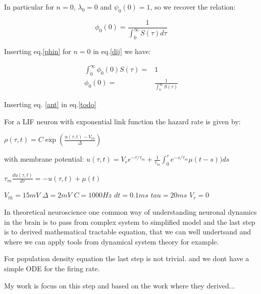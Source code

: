 \documentclass[a4paper,12pt,twoside]{article}
\def \be {\begin{equation}}
\def \ee {\end{equation}}
\begin{document}
In particular for $n=0$, $\lambda_0=0$ and $\psi_0(0)=1$, so we recover the relation:

\be
\phi_0(0) = \frac{1}{\int_0^{\infty}S(\tau)d\tau}
\ee

Inserting eq.\eqref{phin} for $n=0$ in eq.\ref{dij} we have:

\begin{align}
\int_0^{\infty}\phi_0(0)S(\tau) =& 1 \\
\phi_0(0) =& \frac{1}{\int_0^{\infty}S(\tau)}
\end{align}

Inserting eq. \eqref{ant} in eq.\eqref{todo}


For a LIF neuron with exponential link function the hazard rate is given by:

$\rho(\tau,t)=C\exp(\frac{u(\tau,t)-V_{th}}{\Delta})$

with membrane potential:
$u(\tau,t)=V_r e^{-\tau/\tau_m}+\frac{1}{\tau_m}\int_0^\tau  e^{-s/\tau_m}\mu(t-s))ds$

$\tau_m\frac{du(\tau,t)}{d\tau}=-u(\tau,t)+\mu(t)$

$V_{th}=15  mV$
$\Delta = 2     mV$
$C=1000 Hz$
$dt=0.1    ms$
$tau=20   ms$
$V_r=0  $


In theoretical neuroscience one common way of understanding neuronal dynamics in the brain is to pass from complex system to simplified model and the last step is to derived mathematical tractable equation, that we can well undertsand and where we can apply  tools from dynamical system theory for example. 

For population density equation the last step is not trivial. and we dont have a simple ODE for the firing rate.

My work is focus on this step and based on the work where they derived...


\newpage

\mbox{}
\nocite{*}
%


\end{document}

